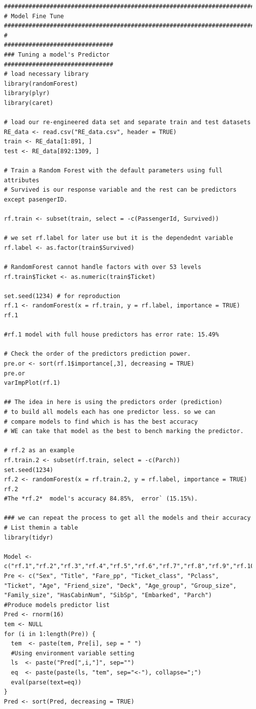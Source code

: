 \documentclass[
]{book}
\begin{document}
\begin{verbatim}
###########################################################################
# Model Fine Tune
###########################################################################
#
###############################
### Tuning a model's Predictor
###############################
# load necessary library
library(randomForest)
library(plyr)
library(caret)

# load our re-engineered data set and separate train and test datasets
RE_data <- read.csv("RE_data.csv", header = TRUE)
train <- RE_data[1:891, ]
test <- RE_data[892:1309, ]

# Train a Random Forest with the default parameters using full attributes
# Survived is our response variable and the rest can be predictors except pasengerID.

rf.train <- subset(train, select = -c(PassengerId, Survived))

# we set rf.label for later use but it is the dependednt variable
rf.label <- as.factor(train$Survived)

# RandomForest cannot handle factors with over 53 levels
rf.train$Ticket <- as.numeric(train$Ticket)

set.seed(1234) # for reproduction
rf.1 <- randomForest(x = rf.train, y = rf.label, importance = TRUE)
rf.1

#rf.1 model with full house predictors has error rate: 15.49%

# Check the order of the predictors prediction power.
pre.or <- sort(rf.1$importance[,3], decreasing = TRUE)
pre.or
varImpPlot(rf.1)

## The idea in here is using the predictors order (prediction)
# to build all models each has one predictor less. so we can
# compare models to find which is has the best accuracy
# WE can take that model as the best to bench marking the predictor.

# rf.2 as an example
rf.train.2 <- subset(rf.train, select = -c(Parch))
set.seed(1234)
rf.2 <- randomForest(x = rf.train.2, y = rf.label, importance = TRUE)
rf.2
#The *rf.2*  model's accuracy 84.85%,  error` (15.15%).

### we can repeat the process to get all the models and their accuracy
# List themin a table
library(tidyr)

Model <- c("rf.1","rf.2","rf.3","rf.4","rf.5","rf.6","rf.7","rf.8","rf.9","rf.10","rf.11","rf.12","rf.13","rf.14","rf.15","rf.16")
Pre <- c("Sex", "Title", "Fare_pp", "Ticket_class", "Pclass", "Ticket", "Age", "Friend_size", "Deck", "Age_group", "Group_size", "Family_size", "HasCabinNum", "SibSp", "Embarked", "Parch")
#Produce models predictor list
Pred <- rnorm(16)
tem <- NULL
for (i in 1:length(Pre)) {
  tem  <- paste(tem, Pre[i], sep = " ")
  #Using environment variable setting
  ls  <- paste("Pred[",i,"]", sep="")
  eq  <- paste(paste(ls, "tem", sep="<-"), collapse=";")
  eval(parse(text=eq))
}
Pred <- sort(Pred, decreasing = TRUE)


\end{verbatim}
\end{document}
